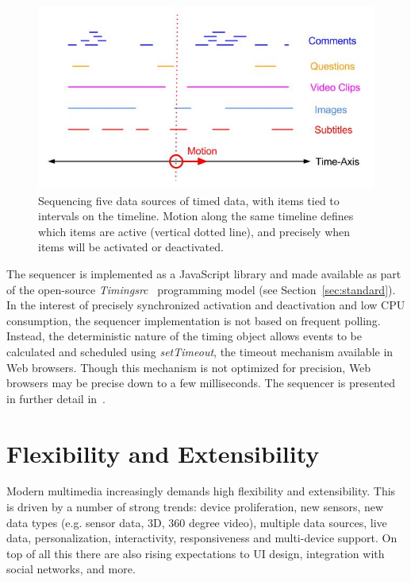 \documentclass[graybox]{svmult}
\begin{document}
\begin{figure}[h]
\centering
\includegraphics[scale=.4]{fig/sequencer.jpg}
\caption{Sequencing five data sources of timed data, with items tied to intervals on the timeline. Motion along the same timeline defines which items are active (vertical dotted line), and precisely when items will be activated or deactivated.}
\label{fig:sequencer}
\end{figure}


The sequencer is implemented as a JavaScript library and made available as
part of the open-source \emph{Timingsrc}~\cite{timingsrc} programming model
(see Section~\ref{sec:standard}). In the interest of precisely synchronized
activation and deactivation and low CPU consumption, the sequencer
implementation is not based on frequent polling. Instead, the deterministic
nature of the timing object allows events to be calculated and scheduled using
\emph{setTimeout}, the timeout mechanism available in Web browsers. Though
this mechanism is not optimized for precision, Web browsers may be precise
down to a few milliseconds. The sequencer is presented in further detail in~\cite{sequencer}.


\section{Flexibility and Extensibility}
\label{sec:flexibility}
Modern multimedia increasingly demands high flexibility and extensibility.
This is driven by a number of strong trends: device proliferation, new
sensors, new data types (e.g. sensor data, 3D, 360 degree video), multiple data
sources, live data, personalization, interactivity, responsiveness and multi-device 
support. On top of all this there are also rising expectations to UI
design, integration with social networks, and more.
\end{document}
